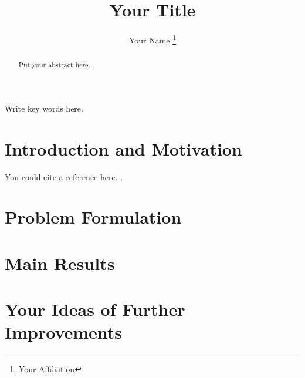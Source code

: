 \documentclass[letterpaper, 10 pt, journal, twoside]{IEEEtran}
\title{Your Title}
\author{ Your Name
\thanks{Your Affiliation}
}
\begin{document}
\maketitle


\begin{abstract}
Put your abstract here.
\end{abstract}
\begin{IEEEkeywords}
Write key words here.
\end{IEEEkeywords}



\section{Introduction and Motivation}
You could cite a reference here. \cite{SMA16TAC}.
\section{Problem Formulation}
\section{Main Results}
\section{Your Ideas of Further Improvements}





\end{document}
